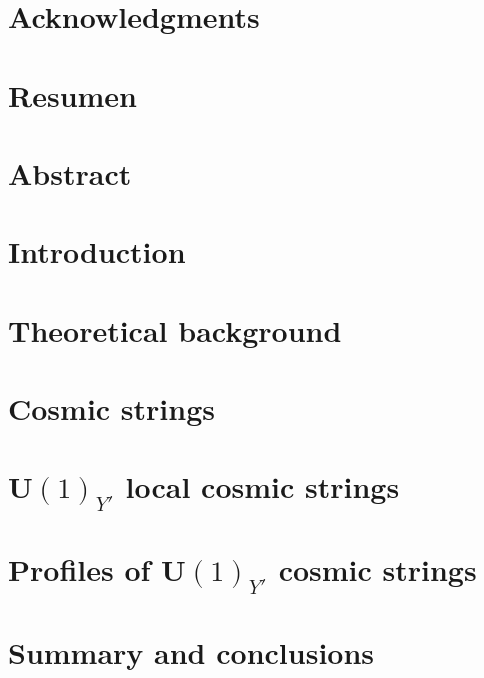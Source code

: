\documentclass[12pt,twoside]{book}
\theoremstyle{definition}
\begin{document}
%				
%			
%			
%

%

\chapter*{Acknowledgments}


\chapter*{Resumen}


\chapter*{Abstract}

\tableofcontents

\chapter{Introduction}\label{chap:intro}


\chapter{Theoretical background}\label{chap:back}


\chapter{Cosmic strings}\label{chap:cosmic}


\chapter{U$(1)_{Y'}$ local cosmic strings}\label{chap:Ycosmic}


\chapter{Profiles of U$(1)_{Y'}$ cosmic strings}\label{chap:results} 


\chapter{Summary and conclusions}%



\end{document}
